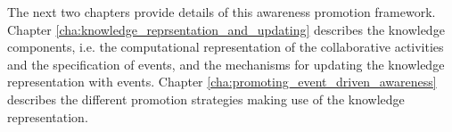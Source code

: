 The next two chapters provide details of this awareness promotion framework. Chapter \ref{cha:knowledge_reprsentation_and_updating} describes the knowledge components, i.e. the computational representation of the collaborative activities and the specification of events, and the mechanisms for updating the knowledge representation with events. Chapter \ref{cha:promoting_event_driven_awareness} describes the different promotion strategies making use of the knowledge representation.



 

